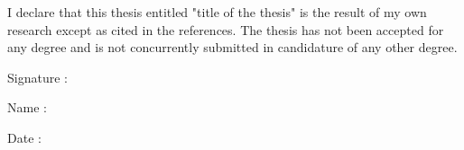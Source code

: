 
\setupindenting[no]
\vfill

I declare that this thesis entitled "title of the thesis" is the result of my
own research except as cited in the references. The thesis has not been
accepted for any degree and is not concurrently submitted in candidature of any
other degree.

\blank[4*line]

Signature : \periods[18] \hfill

Name : \periods[18] \hfill

Date : \periods[18] \hfill

\vfill
\setupindenting[yes]

